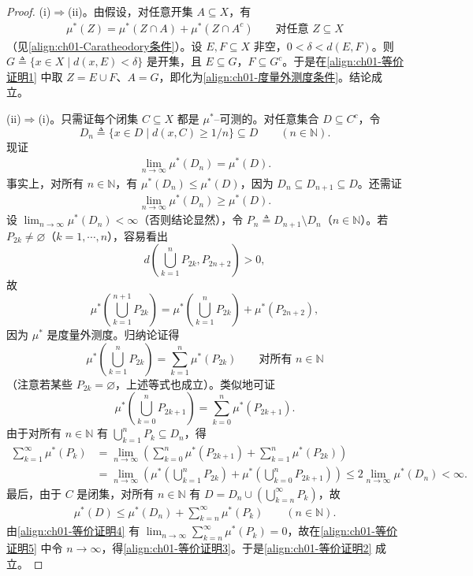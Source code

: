 \documentclass[../../main.tex]{subfiles}%
\begin{document}
\begin{proof}
(i)$\Rightarrow$(ii)。由假设，对任意开集 $A\subseteq X$，有
\begin{align}
\mu^*(Z)=\mu^*(Z\cap A)+\mu^*(Z\cap A^c)\qquad\text{对任意 }Z\subseteq X \label{align:ch01-等价证明1}
\end{align}
（见\eqref{align:ch01-Caratheodory条件}）。设 $E,F\subseteq X$ 非空，$0<\delta<d(E,F)$。则 $G\triangleq \{x\in X\mid d(x,E)<\delta\}$ 是开集，且 $E\subseteq G$，$F\subseteq G^c$。于是在\eqref{align:ch01-等价证明1} 中取 $Z=E\cup F$、$A=G$，即化为\eqref{align:ch01-度量外测度条件}。结论成立。

(ii)$\Rightarrow$(i)。只需证每个闭集 $C\subseteq X$ 都是 $\mu^*$--可测的。对任意集合 $D\subseteq C^c$，令
\[
D_n\triangleq \{x\in D\mid d(x,C)\geqslant 1/n\}\subseteq D\qquad(n\in\mathbb{N}).
\]
现证
\begin{align}
\lim_{n\to\infty}\mu^*(D_n)=\mu^*(D). \label{align:ch01-等价证明2}
\end{align}
事实上，对所有 $n\in\mathbb{N}$，有 $\mu^*(D_n)\leqslant\mu^*(D)$，因为 $D_n\subseteq D_{n+1}\subseteq D$。还需证
\begin{align}
\lim_{n\to\infty}\mu^*(D_n)\geqslant\mu^*(D). \label{align:ch01-等价证明3}
\end{align}
设 $\lim_{n\to\infty}\mu^*(D_n)<\infty$（否则结论显然），令 $P_n\triangleq D_{n+1}\setminus D_n$（$n\in\mathbb{N}$）。若 $P_{2k}\neq\varnothing $（$k=1,\cdots ,n$），容易看出
\[
d\left(\bigcup_{k=1}^n P_{2k},P_{2n+2}\right)>0,
\]
故
\[
\mu^*\left(\bigcup_{k=1}^{n+1}P_{2k}\right)=\mu^*\left(\bigcup_{k=1}^n P_{2k}\right)+\mu^*(P_{2n+2}),
\]
因为 $\mu^*$ 是度量外测度。归纳论证得
\[
\mu^*\left(\bigcup_{k=1}^n P_{2k}\right)=\sum_{k=1}^n\mu^*(P_{2k})\qquad\text{对所有 }n\in\mathbb{N}
\]
（注意若某些 $P_{2k}=\varnothing $，上述等式也成立）。类似地可证
\[
\mu^*\left(\bigcup_{k=0}^n P_{2k+1}\right)=\sum_{k=0}^n\mu^*(P_{2k+1}).
\]
由于对所有 $n\in\mathbb{N}$ 有 $\bigcup_{k=1}^n P_k\subseteq D_n$，得
\begin{align}
\sum_{k=1}^\infty\mu^*(P_k)
&=\lim_{n\to\infty}\left(\sum_{k=0}^n\mu^*(P_{2k+1})+\sum_{k=1}^n\mu^*(P_{2k})\right) \label{align:ch01-等价证明4}\\
&=\lim_{n\to\infty}\left(\mu^*\left(\bigcup_{k=1}^n P_{2k}\right)+\mu^*\left(\bigcup_{k=0}^n P_{2k+1}\right)\right)
\leqslant 2\lim_{n\to\infty}\mu^*(D_n)<\infty. \nonumber
\end{align}
最后，由于 $C$ 是闭集，对所有 $n\in\mathbb{N}$ 有 $D=D_n\cup\left(\bigcup_{k=n}^\infty P_k\right)$，故
\begin{align}
\mu^*(D)\leqslant\mu^*(D_n)+\sum_{k=n}^\infty\mu^*(P_k)\qquad(n\in\mathbb{N}). \label{align:ch01-等价证明5}
\end{align}
由\eqref{align:ch01-等价证明4} 有 $\lim_{n\to\infty}\sum_{k=n}^\infty\mu^*(P_k)=0$，故在\eqref{align:ch01-等价证明5} 中令 $n\to\infty$，得\eqref{align:ch01-等价证明3}。于是\eqref{align:ch01-等价证明2} 成立。


\end{proof}
\end{document}
